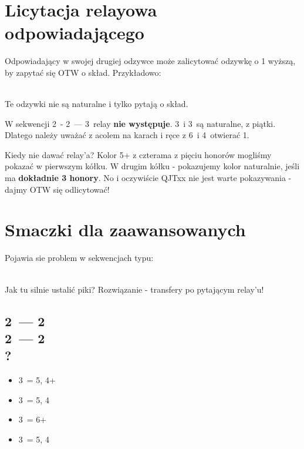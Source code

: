 \documentclass[12pt, a4paper]{article}
\begin{document}
\section{Licytacja relayowa odpowiadającego}
\raggedright
Odpowiadający w swojej drugiej odzywce może zalicytować odzywkę o 1 wyższą, by zapytać się OTW o skład.
Przykładowo: \\[1em]
\webidding{
    2\clubs & 2\diams \\
    2\hearts & \conventional{2\spades}
}
\webidding{
    2\clubs & 2\diams \\
    2\spades & \conventional{2\ntx}
} \\[1em]
\raggedright
Te odzywki nie są naturalne i tylko pytają o skład.

\begin{formal}
    W sekwencji 2\clubs\ - 2\diams\ --- 3\diams\ relay \textbf{nie występuje}. 3\hearts\ i 3\spades\ są naturalne,
    z piątki. Dlatego należy uważać z acolem na karach i ręce z 6\diams\ i 4\major\ otwierać 1\diams.
\end{formal}

Kiedy nie dawać relay'a? Kolor 5+ z czterama z pięciu honorów mogliśmy pokazać w pierwszym kółku.
W drugim kółku - pokazujemy kolor naturalnie, jeśli ma \textbf{dokładnie 3 honory}. No i oczywiście
\diams QJTxx nie jest warte pokazywania - dajmy OTW się odlicytować!

\pagebreak
\section{Smaczki dla zaawansowanych}
\raggedright
Pojawia sie problem w sekwencjach typu: \\[1em]

 \\[1em] \raggedright

Jak tu silnie ustalić piki? Rozwiązanie - transfery po pytającym relay'u!

\subsection*{2\clubs\ --- 2\diams\ \\ 2\spades\ --- 2\nt\ \\ ?}
\begin{itemize}
    \item 3\clubs\ = 5\spades, 4+\diams
    \item 3\diams\ = 5\spades, 4\hearts
    \item 3\hearts\ = 6+\spades
    \item 3\spades\ = 5\spades, 4\clubs
\end{itemize}
\end{document}
